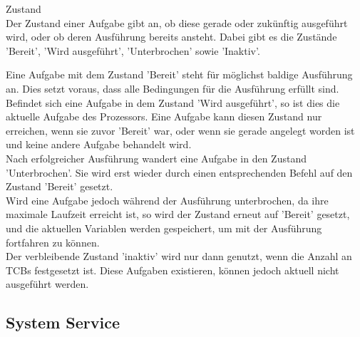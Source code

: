 \begin{definition}{Zustand}\\
Der Zustand einer Aufgabe gibt an, ob diese gerade oder zukünftig ausgeführt wird, oder ob deren Ausführung bereits ansteht. Dabei gibt es die Zustände 'Bereit', 'Wird ausgeführt', 'Unterbrochen' sowie 'Inaktiv'.
\end{definition}
Eine Aufgabe mit dem Zustand 'Bereit' steht für möglichst baldige Ausführung an. Dies setzt voraus, dass alle Bedingungen für die Ausführung erfüllt sind.\\
Befindet sich eine Aufgabe in dem Zustand 'Wird ausgeführt', so ist dies die aktuelle Aufgabe des Prozessors. Eine Aufgabe kann diesen Zustand nur erreichen, wenn sie zuvor 'Bereit' war, oder wenn sie gerade angelegt worden ist und keine andere Aufgabe behandelt wird.\\
Nach erfolgreicher Ausführung wandert eine Aufgabe in den Zustand 'Unterbrochen'. Sie wird erst wieder durch einen entsprechenden Befehl auf den Zustand 'Bereit' gesetzt.\\
Wird eine Aufgabe jedoch während der Ausführung unterbrochen, da ihre maximale Laufzeit erreicht ist, so wird der Zustand erneut auf 'Bereit' gesetzt, und die aktuellen Variablen werden gespeichert, um mit der Ausführung fortfahren zu können.\\
Der verbleibende Zustand 'inaktiv' wird nur dann genutzt, wenn die Anzahl an TCBs festgesetzt ist. Diese Aufgaben existieren, können jedoch aktuell nicht ausgeführt werden.

\begin{definition}{}
\end{definition}
\subsection{System Service}\label{2.8}